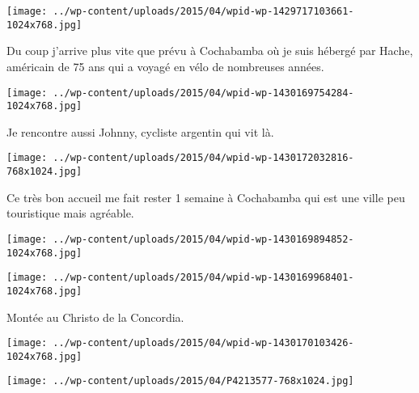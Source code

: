 \begin{center} \texttt{[image: ../wp-content/uploads/2015/04/wpid-wp-1429717103661-1024x768.jpg]} \end{center}

 

 Du coup j'arrive plus vite que prévu à Cochabamba où je suis hébergé par Hache, américain de 75 ans qui a voyagé en vélo de nombreuses années. 

 

\begin{center} \texttt{[image: ../wp-content/uploads/2015/04/wpid-wp-1430169754284-1024x768.jpg]} \end{center}

 

 Je rencontre aussi Johnny, cycliste argentin qui vit là. 

 

\begin{center} \texttt{[image: ../wp-content/uploads/2015/04/wpid-wp-1430172032816-768x1024.jpg]} \end{center}

 

 Ce très bon accueil me fait rester 1 semaine à Cochabamba qui est une ville peu touristique mais agréable. 

 

\begin{center} \texttt{[image: ../wp-content/uploads/2015/04/wpid-wp-1430169894852-1024x768.jpg]} \end{center}

 

 

\begin{center} \texttt{[image: ../wp-content/uploads/2015/04/wpid-wp-1430169968401-1024x768.jpg]} \end{center}

 

 Montée au Christo de la Concordia. 

 

\begin{center} \texttt{[image: ../wp-content/uploads/2015/04/wpid-wp-1430170103426-1024x768.jpg]} \end{center}

 

 

\begin{center} \texttt{[image: ../wp-content/uploads/2015/04/P4213577-768x1024.jpg]} \end{center}

